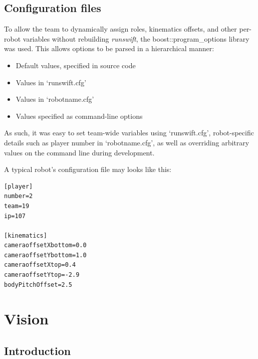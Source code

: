 \documentclass[pdftex,11pt,a4paper]{report}
\begin{document}
\section{Configuration files}

To allow the team to dynamically assign roles, kinematics offsets, and other per-robot variables without rebuilding \emph{{runswift}}, the boost::program\_options library was used. This allows options to be parsed in a hierarchical manner:

\begin{itemize}
   \item{Default values, specified in source code}
   \item{Values in `runswift.cfg'}
   \item{Values in `robotname.cfg'}
   \item{Values specified as command-line options}
\end{itemize}

As such, it was easy to set team-wide variables using `runswift.cfg', robot-specific details such as player number in `robotname.cfg', as well as overriding arbitrary values on the command line during development.

A typical robot's configuration file may looks like this:

\begin{lstlisting}
[player]
number=2
team=19
ip=107

[kinematics]
cameraoffsetXbottom=0.0
cameraoffsetYbottom=1.0
cameraoffsetXtop=0.4
cameraoffsetYtop=-2.9
bodyPitchOffset=2.5
\end{lstlisting}
\newpage
\chapter{Vision} \label{sectionVision}

\section{Introduction}
\end{document}
